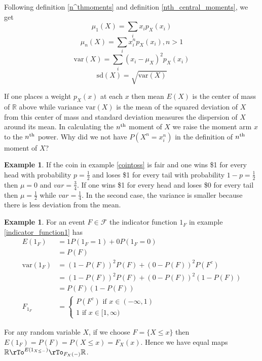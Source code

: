 \documentclass[12pt]{amsart}
\theoremstyle{definition}
\newtheorem{example}[theorem]{Example}
\begin{document}
Following definition \ref{n^thmoments} and definition \ref{nth_central_moments}, we get
$$\mu_1(X) = \sum\limits_i x_i p_X(x_i)$$
$$\mu_n(X) = \sum\limits_i x_i^n p_X(x_i), n > 1$$
$$\text{var}(X) = \sum\limits_i (x_i - \mu_X)^2 p_X(x_i)$$
$$\text{sd}(X) = \sqrt{\text{var}(X)}$$

If one places a weight $p_X(x)$ at each $x$ then mean $E(X)$ is the center of mass of $\mathbb{R}$ above while variance $\text{var}(X)$ is the mean of the squared deviation of $X$ from this center of mass and standard deviation measures the dispersion of $X$ around its mean. In calculating the $n^{\textnormal{th}}$ moment of $X$ we raise the moment arm $x$ to the $n^{\textnormal{th}}$ power. Why did we not have $P(X^n = x_i^n)$ in the definition of $n^{\textnormal{th}}$ moment of $X$?

\begin{example} \label{cointossvariance} If the coin in example \ref{cointoss} is fair and one wins \$1 for every head with probability $p = \frac{1}{2}$ and loses \$1 for every tail with probability $1 - p = \frac{1}{2}$ then $\mu = 0$ and $var = \frac{3}{4}$. If one wins \$1 for every head and loses \$0 for every tail then $\mu = \frac{1}{2}$ while $var = \frac{1}{4}$. In the second case, the variance is smaller because there is less deviation from the mean.
\end{example}

\begin{example} \label{indicator_function2} For an event $F \in \mathcal{F}$ the indicator function $1_F$ in example \ref{indicator_function1} has
\begin{align*}
E(1_F) & = 1P(1_F = 1) + 0P(1_F = 0) \\
 & = P(F) \\
\text{var}(1_F) & = (1 - P(F))^2 P(F) + (0 - P(F))^2P(F^c) \\
 & = (1 - P(F))^2 P(F) + (0 - P(F))^2(1-P(F)) \\
 & = P(F)(1-P(F)) \\
F_{1_F} & = \begin{cases} P(F^c) \text{ if } x \in (-\infty, 1) \\ 1 \text{ if } x \in [1, \infty) \end{cases}
\end{align*}

For any random variable $X$, if we choose $F = \{X \leq x\}$ then $E(1_F) = P(F) = P(X \leq x) = F_X(x)$. Hence we have equal maps $\mathbb{R} \pile{\rTo^{E(1_{X \leq -})} \\ \rTo_{F_X(-)}} \mathbb{R}$.
\end{example}
\end{document}
